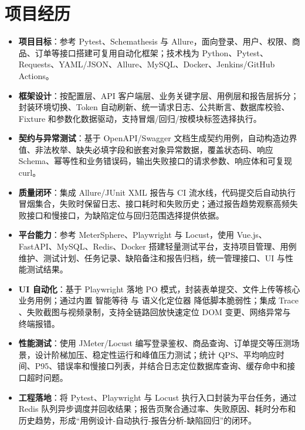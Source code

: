 \documentclass[10pt]{article}
\begin{document}


    \section[项目经历]{\makebox[\iconwidth][c]{\color{primarycolor}{\faProjectDiagram}}\quad 项目经历}

    \begin{itemize}
        \item \textbf{项目目标}：参考 Pytest、Schemathesis 与 Allure，面向登录、用户、权限、商品、订单等接口搭建可复用自动化框架；技术栈为 Python、Pytest、Requests、YAML/JSON、Allure、MySQL、Docker、Jenkins/GitHub Actions。
        \item \textbf{框架设计}：按配置层、API 客户端层、业务关键字层、用例层和报告层拆分；封装环境切换、Token 自动刷新、统一请求日志、公共断言、数据库校验、Fixture 和参数化数据驱动，支持冒烟/回归/按模块标签选择执行。
        \item \textbf{契约与异常测试}：基于 OpenAPI/Swagger 文档生成契约用例，自动构造边界值、非法枚举、缺失必填字段和嵌套对象异常数据，覆盖状态码、响应 Schema、幂等性和业务错误码，输出失败接口的请求参数、响应体和可复现 curl。
        \item \textbf{质量闭环}：集成 Allure/JUnit XML 报告与 CI 流水线，代码提交后自动执行冒烟集合，失败时保留日志、接口耗时和失败历史；通过报告趋势观察高频失败接口和慢接口，为缺陷定位与回归范围选择提供依据。
    \end{itemize}

    \vspace{0.25em}

    \begin{itemize}
        \item \textbf{平台能力}：参考 MeterSphere、Playwright 与 Locust，使用 Vue.js、FastAPI、MySQL、Redis、Docker 搭建轻量测试平台，支持项目管理、用例维护、测试计划、任务记录、缺陷备注和报告归档，统一管理接口、UI 与性能测试结果。
        \item \textbf{UI 自动化}：基于 Playwright 落地 PO 模式，封装表单提交、文件上传等核心业务用例；通过内置 智能等待 与 语义化定位器 降低脚本脆弱性；集成 Trace 、失败截图与视频录制，支持全链路回放快速定位 DOM 变更、网络异常与 终端报错。
        \item \textbf{性能测试}：使用 JMeter/Locust 编写登录鉴权、商品查询、订单提交等压测场景，设计阶梯加压、稳定性运行和峰值压力测试；统计 QPS、平均响应时间、P95、错误率和慢接口列表，并结合日志定位数据库查询、缓存命中和接口超时问题。
        \item \textbf{工程落地}：将 Pytest、Playwright 与 Locust 执行入口封装为平台任务，通过 Redis 队列异步调度并回收结果；报告页聚合通过率、失败原因、耗时分布和历史趋势，形成“用例设计-自动执行-报告分析-缺陷回归”的闭环。
    \end{itemize}
\end{document}
